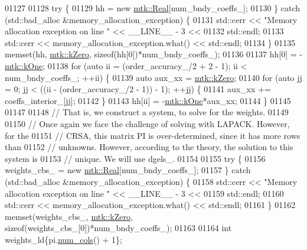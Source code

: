 \begin{DoxyCode}
{{01127 
01128   \textcolor{keywordflow}{try} \{
01129     hh = \textcolor{keyword}{new} \hyperlink{group__c01-roots_gac080bbbf5cbb5502c9f00405f894857d}{mtk::Real}[num\_bndy\_coeffs\_];
01130   \} \textcolor{keywordflow}{catch} (std::bad\_alloc &memory\_allocation\_exception) \{
01131     std::cerr << \textcolor{stringliteral}{"Memory allocation exception on line "} << \_\_LINE\_\_ - 3 <<
01132       std::endl;
01133     std::cerr << memory\_allocation\_exception.what() << std::endl;
01134   \}
01135   memset(hh, \hyperlink{group__c01-roots_ga59a451a5fae30d59649bcda274fea271}{mtk::kZero}, \textcolor{keyword}{sizeof}(hh[0])*num\_bndy\_coeffs\_);
01136 
01137   hh[0] = -\hyperlink{group__c01-roots_ga26407c24d43b6b95480943340d285c71}{mtk::kOne};
01138   \textcolor{keywordflow}{for} (\textcolor{keyword}{auto} ii = (order\_accuracy\_/2 + 2 - 1); ii < num\_bndy\_coeffs\_; ++ii) \{
01139     \textcolor{keyword}{auto} aux\_xx = \hyperlink{group__c01-roots_ga59a451a5fae30d59649bcda274fea271}{mtk::kZero};
01140     \textcolor{keywordflow}{for} (\textcolor{keyword}{auto} jj = 0; jj < ((ii - (order\_accuracy\_/2 - 1)) - 1); ++jj) \{
01141       aux\_xx += coeffs\_interior\_[jj];
01142     \}
01143     hh[ii] = -\hyperlink{group__c01-roots_ga26407c24d43b6b95480943340d285c71}{mtk::kOne}*aux\_xx;
01144   \}
01145 
01147 
01148   \textcolor{comment}{// That is, we construct a system, to solve for the weights.}
01149 
01150   \textcolor{comment}{// Once again we face the challenge of solving with LAPACK. However, for the}
01151   \textcolor{comment}{// CRSA, this matrix PI is over-determined, since it has more rows than}
01152   \textcolor{comment}{// unknowns. However, according to the theory, the solution to this system is}
01153   \textcolor{comment}{// unique. We will use dgels\_.}
01154 
01155   \textcolor{keywordflow}{try} \{
01156     weights\_cbs\_ = \textcolor{keyword}{new} \hyperlink{group__c01-roots_gac080bbbf5cbb5502c9f00405f894857d}{mtk::Real}[num\_bndy\_coeffs\_];
01157   \} \textcolor{keywordflow}{catch} (std::bad\_alloc &memory\_allocation\_exception) \{
01158     std::cerr << \textcolor{stringliteral}{"Memory allocation exception on line "} << \_\_LINE\_\_ - 3 <<
01159       std::endl;
01160     std::cerr << memory\_allocation\_exception.what() << std::endl;
01161   \}
01162   memset(weights\_cbs\_, \hyperlink{group__c01-roots_ga59a451a5fae30d59649bcda274fea271}{mtk::kZero}, \textcolor{keyword}{sizeof}(weights\_cbs\_[0])*num\_bndy\_coeffs\_);
01163 
01164   \textcolor{keywordtype}{int} weights\_ld\{pi.\hyperlink{classmtk_1_1DenseMatrix_a41747502d468c6728a4be31501b16e0e}{num\_cols}() + 1\};
}}
\end{DoxyCode}

